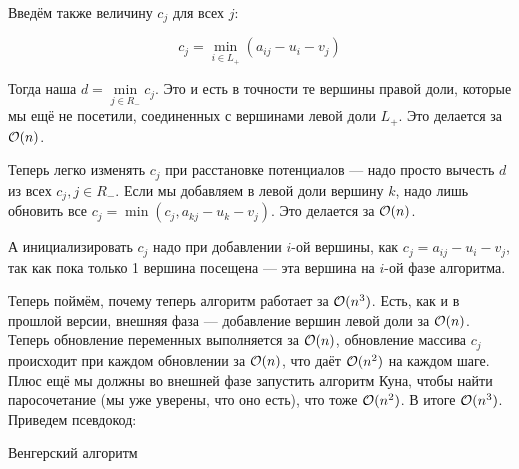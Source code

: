 \documentclass[a4paper, 12pt]{article}
\begin{document}
Введём также величину $c_j$ для всех $j$:

\[
  c_j = \min\limits_{i \in L_+} (a_{ij} - u_i - v_j)
\]

Тогда наша $d = \min\limits_{j \in R_-} c_j$. Это и есть в точности те вершины правой доли,
которые мы ещё не посетили, соединенных с вершинами левой доли $L_+$. Это делается
за $\mathcal{O}(n)$.

Теперь легко изменять $c_j$ при расстановке потенциалов --- надо просто вычесть
$d$ из всех $c_j, j \in R_-$. Если мы добавляем в левой доли вершину $k$, надо лишь
обновить все $c_j = \min(c_j, a_{kj} - u_k - v_j)$. Это делается за $\mathcal{O}(n)$.

А инициализировать $c_j$ надо
при добавлении $i$-ой вершины, как $c_j = a_{ij} - u_i - v_j$, так как пока
только 1 вершина посещена --- эта вершина на $i$-ой фазе алгоритма.

Теперь поймём, почему теперь алгоритм работает за $\mathcal{O}(n^3)$. Есть, как и в
прошлой версии, внешняя фаза --- добавление вершин левой доли за $\mathcal{O}(n)$. Теперь
обновление переменных выполняется за $\mathcal{O}(n)$, обновление массива $c_j$ происходит
при каждом обновлении за $\mathcal{O}(n)$, что даёт $\mathcal{O}(n^2)$ на каждом шаге. Плюс
ещё мы должны во внешней фазе запустить алгоритм Куна, чтобы найти паросочетание (мы
уже уверены, что оно есть), что тоже $\mathcal{O}(n^2)$. В итоге $\mathcal{O}(n^3)$. Приведем
псевдокод:

\begin{algorithm}
  \caption{Венгерский алгоритм}
    \begin{algorithmic}[1]
       
         
           
           
           
           
             
               
                 
                 
                 
              \Else
                 
                 
              \EndIf
            \EndIf
          \EndFor
        \EndWhile
      \EndFor
    \end{algorithmic}
\end{algorithm}
\end{document}
